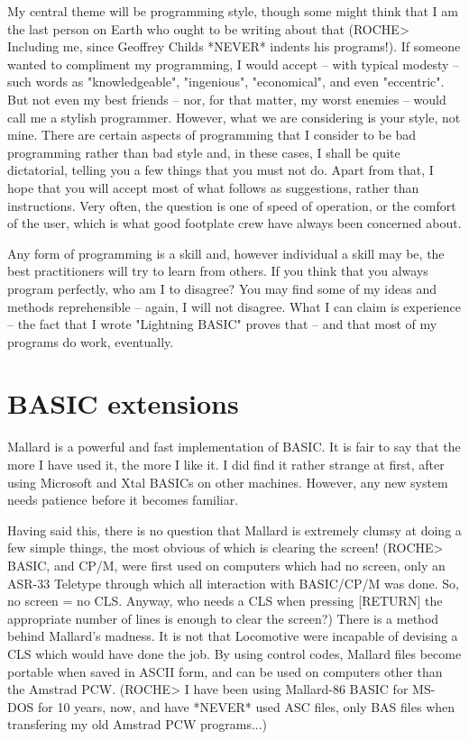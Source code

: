 \documentclass[]{report} %
\begin{document}
My central theme will be programming style, though some might think that I  am 
the last person on Earth who ought to be writing about that (ROCHE>  Including 
me, since Geoffrey Childs *NEVER* indents his programs!). If someone wanted to 
compliment  my  programming, I would accept -- with typical  modesty  --  such 
words as "knowledgeable", "ingenious", "economical", and even "eccentric". But 
not  even my best friends -- nor, for that matter, my worst enemies  --  would 
call me a stylish programmer. However, what we are considering is your  style, 
not  mine. There are certain aspects of programming that I consider to be  bad 
programming  rather  than  bad style and, in these cases,  I  shall  be  quite 
dictatorial, telling you a few things that you must not do. Apart from that, I 
hope  that  you will accept most of what follows as suggestions,  rather  than 
instructions.  Very often, the question is one of speed of operation,  or  the 
comfort  of  the  user, which is what good footplate  crew  have  always  been 
concerned about.

Any form of programming is a skill and, however individual a skill may be, the 
best practitioners will try to learn from others. If you think that you always 
program  perfectly,  who am I to disagree? You may find some of my  ideas  and 
methods  reprehensible  --  again, I will not disagree. What I  can  claim  is 
experience -- the fact that I wrote "Lightning BASIC" proves that -- and  that 
most of my programs do work, eventually.

\section{BASIC extensions}
Mallard is a powerful and fast implementation of BASIC. It is fair to say that 
the  more I have used it, the more I like it. I did find it rather strange  at 
first,  after using Microsoft and Xtal BASICs on other machines. However,  any 
new system needs patience before it becomes familiar.

Having  said  this, there is no question that Mallard is extremely  clumsy  at 
doing  a few simple things, the most obvious of which is clearing the  screen! 
(ROCHE>  BASIC,  and CP/M, were first used on computers which had  no  screen, 
only  an  ASR-33 Teletype through which all interaction  with  BASIC/CP/M  was 
done.  So, no screen = no CLS. Anyway, who needs a CLS when pressing  [RETURN] 
the  appropriate  number of lines is enough to clear the screen?) There  is  a 
method  behind Mallard's madness. It is not that Locomotive were incapable  of 
devising a CLS which would have done the job. By using control codes,  Mallard 
files  become portable when saved in ASCII form, and can be used on  computers 
other than the Amstrad PCW. (ROCHE> I have been using Mallard-86 BASIC for MS-
DOS  for 10 years, now, and have *NEVER* used ASC files, only BAS  files  when 
transfering my old Amstrad PCW programs...)
\end{document}
